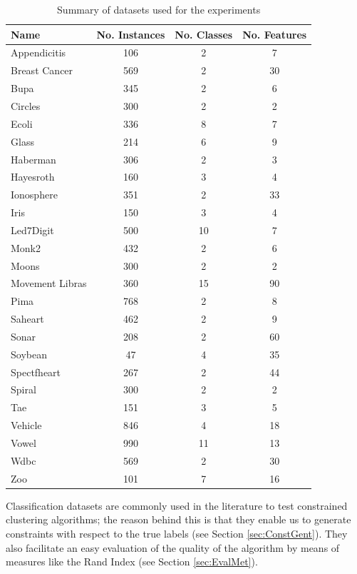 \documentclass[review]{elsarticle}
\begin{document}
\begin{table}[!h]
	\centering
	\small
	\begin{tabular}{l c c c}
		\hline
		Name & No. Instances & No. Classes & No. Features \\
		\hline
		Appendicitis & 106 & 2 & 7 \\
		Breast Cancer & 569 & 2 & 30 \\
		Bupa & 345 & 2 & 6 \\
		Circles & 300 & 2 & 2 \\
		Ecoli & 336 & 8 & 7 \\
		Glass & 214 & 6 & 9 \\
		Haberman & 306 & 2 & 3 \\
		Hayesroth & 160 & 3 & 4 \\
		Ionosphere & 351 & 2 & 33 \\
		Iris & 150 & 3 & 4 \\
		Led7Digit & 500 & 10 & 7 \\
		Monk2 & 432 & 2 & 6 \\
		Moons & 300 & 2 & 2 \\
		Movement Libras & 360 & 15 & 90 \\
		Pima & 768 & 2 & 8 \\
		Saheart & 462 & 2 & 9 \\
		Sonar & 208 & 2 & 60 \\
		Soybean & 47 & 4 & 35 \\
		Spectfheart & 267 & 2 & 44 \\
		Spiral & 300 & 2 & 2 \\
		Tae & 151 & 3 & 5 \\
		Vehicle & 846 & 4 & 18 \\
		Vowel & 990 & 11 & 13 \\
		Wdbc & 569 & 2 & 30 \\
		Zoo & 101 & 7 & 16 \\
		\hline

	\end{tabular}%
	\caption{Summary of datasets used for the experiments}
	\label{tab:datasets}
\end{table}

Classification datasets are commonly used in the literature to test constrained clustering algorithms; the reason behind this is that they enable us to generate constraints with respect to the true labels (see Section \ref{sec:ConstGent}). They also facilitate an easy evaluation of the quality of the algorithm by means of measures like the Rand Index (see Section \ref{sec:EvalMet}).
\end{document}
